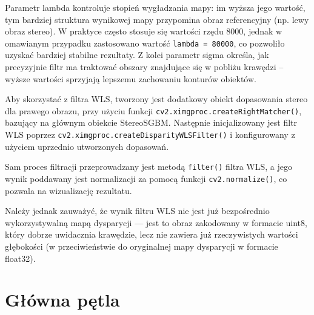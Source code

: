 \documentclass[magisterska]{pracadypl}
\begin{document}
Parametr lambda kontroluje stopień wygładzania mapy: im wyższa jego wartość, tym bardziej struktura wynikowej mapy przypomina obraz referencyjny (np. lewy obraz stereo). W praktyce często stosuje się wartości rzędu 8000, jednak w omawianym przypadku zastosowano wartość \texttt{lambda = 80000}, co pozwoliło uzyskać bardziej stabilne rezultaty. Z kolei parametr sigma określa, jak precyzyjnie filtr ma traktować obszary znajdujące się w pobliżu krawędzi – wyższe wartości sprzyjają lepszemu zachowaniu konturów obiektów.

Aby skorzystać z filtra WLS, tworzony jest dodatkowy obiekt dopasowania stereo dla prawego obrazu, przy użyciu funkcji \texttt{cv2.ximgproc.createRightMatcher()}, bazujący na głównym obiekcie StereoSGBM. Następnie inicjalizowany jest filtr WLS poprzez \texttt{cv2.ximgproc.\allowbreak createDisparityWLSFilter()} i konfigurowany z użyciem uprzednio utworzonych dopasowań.

Sam proces filtracji przeprowadzany jest metodą \texttt{filter()} filtra WLS, a jego wynik poddawany jest normalizacji za pomocą funkcji \texttt{cv2.normalize()}, co pozwala na wizualizację rezultatu.

Należy jednak zauważyć, że wynik filtru WLS nie jest już bezpośrednio wykorzystywalną mapą dysparycji — jest to obraz zakodowany w formacie uint8, który dobrze uwidacznia krawędzie, lecz nie zawiera już rzeczywistych wartości głębokości (w przeciwieństwie do oryginalnej mapy dysparycji w formacie float32).

\section{Główna pętla}
\end{document}
